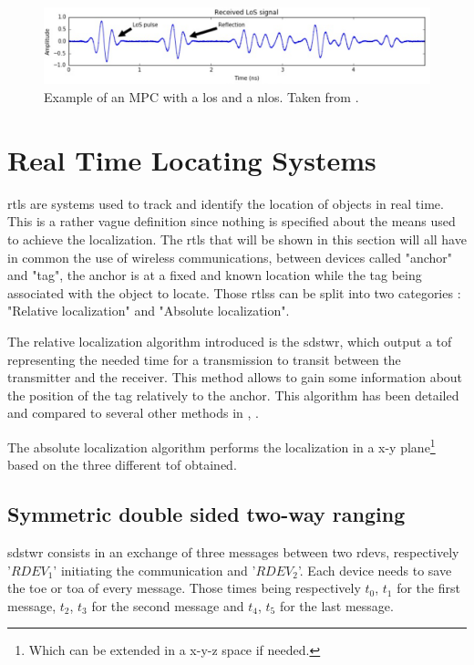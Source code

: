 \begin{figure}[H]
\centering
\includegraphics[width=.9\linewidth]{Images/mpc_pulses.png}
\caption{Example of an MPC with a \gls{los} and a \gls{nlos}. Taken from \cite{defraye2017determining}.}
\label{fig:UWB_MPC_Theo}
\end{figure}

\section{Real Time Locating Systems}
\label{rtls}
\gls{rtls} are systems used to track and identify the location of objects in real time. This is a rather vague definition since nothing is specified about the means used to achieve the localization. The \gls{rtls} that will be shown in this section will all have in common the use of wireless communications, between devices called "anchor" and "tag", the anchor is at a fixed and known location while the tag being associated with the object to locate. Those \glspl{rtls} can be split into two categories : "Relative localization" and "Absolute localization".
\vspace{2mm}

The relative localization algorithm introduced is the \gls{sdstwr}, which output a \gls{tof} representing the needed time for a transmission to transit between the transmitter and the receiver. This method allows to gain some information about the position of the tag relatively to the anchor. This algorithm has been detailed and compared to several other methods in \cite{fesler2018high}, \cite{hannotier2019indoor}.
\vspace{2mm}

The absolute localization algorithm performs the localization in a x-y plane\footnote{Which can be extended in a x-y-z space if needed.} based on the three different \gls{tof} obtained.


\subsection{Symmetric double sided two-way ranging}
\label{sds2wr}

\gls{sdstwr} consists in an exchange of three messages between two \glspl{rdev}, respectively '$RDEV_1$' initiating the communication and '$RDEV_2$'. Each device needs to save the \gls{toe} or \gls{toa} of every message. Those times being respectively $t_0$, $t_1$ for the first message, $t_2$, $t_3$ for the second message and $t_4$, $t_5$ for the last message.
\vspace{2mm}

